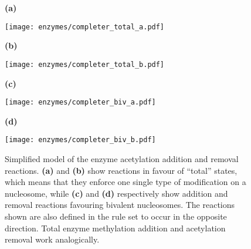                 \begin{figure}[htpb!]
                    \centering
                    \begin{minipage}[t][10cm]{\textwidth}
                        \begin{minipage}{0.15\textwidth}
                            \caption*{\small \textbf{(a)}}
                        \end{minipage}
                        \begin{minipage}{0.8\textwidth}
                            \texttt{[image: enzymes/completer\_total\_a.pdf]}
                        \end{minipage}
                        \vfill
                        \begin{minipage}{0.15\textwidth}
                            \caption*{\small \textbf{(b)}}
                        \end{minipage}
                        \begin{minipage}{0.8\textwidth}
                            \texttt{[image: enzymes/completer\_total\_b.pdf]}
                        \end{minipage}
                        \vfill
                        \begin{minipage}{0.15\textwidth}
                            \caption*{\small \textbf{(c)}}
                        \end{minipage}
                        \begin{minipage}{0.8\textwidth}
                            \texttt{[image: enzymes/completer\_biv\_a.pdf]}
                        \end{minipage}
                        \vfill
                        \begin{minipage}{0.15\textwidth}
                            \caption*{\small \textbf{(d)}}
                        \end{minipage}
                        \begin{minipage}{0.8\textwidth}
                            \texttt{[image: enzymes/completer\_biv\_b.pdf]}
                        \end{minipage}
                    \end{minipage}
                    \caption{Simplified model of the enzyme acetylation addition and removal reactions. \textbf{(a)} and \textbf{(b)} show reactions in favour of “total” states, which means that they enforce one single type of modification on a nucleosome, while \textbf{(c)} and \textbf{(d)} respectively show addition and removal reactions favouring bivalent nucleosomes. The reactions shown are also defined in the rule set to occur in the opposite direction. Total enzyme methylation addition and acetylation removal work analogically.}
                    \label{img:completerEnzymes}
                \end{figure}

